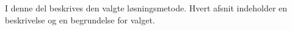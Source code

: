I denne del beskrives den valgte løsningsmetode.
Hvert afsnit indeholder en beskrivelse og en begrundelse for valget.
